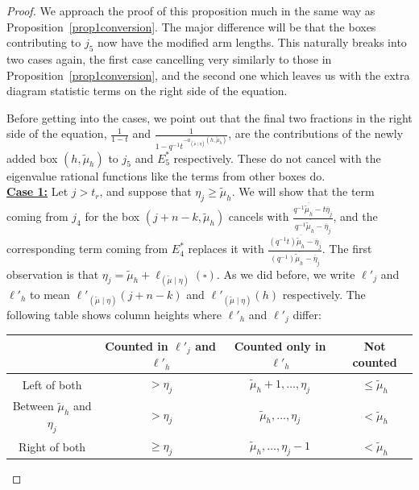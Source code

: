 \documentclass[ALCO]{cedram}
\newcommand{\mutilde}{{\widetilde{\mu}}}
\newcommand{\mutildeeta}{{(\mutilde \mid \eta)}}
\newcommand{\leg}[1]{{\ell_{#1}(\square)}}
\newcommand{\jfour}{j_4}
\newcommand{\jfive}{j_5}
\newcommand{\Estarfour}{E^*_4}
\newcommand{\Estarfive}{E^*_5}
\newcommand{\lj}{\ell'_j}
\newcommand{\lh}{\ell'_h}
\begin{document}
\begin{proof} 
We approach the proof of this proposition much in the same way as Proposition~\ref{prop1conversion}. The major difference will be that the boxes contributing to $\jfive$ now have the modified arm lengths. This naturally breaks into two cases again, the first case cancelling very similarly to those in Proposition~\ref{prop1conversion}, and the second one which leaves us with the extra diagram statistic terms on the right side of the equation.

Before getting into the cases, we point out that the final two fractions in the right side of the equation, $\displaystyle{\frac{1}{1-t}}$ and $\displaystyle{\frac{1}{1-q^{-1}t^{-a_\mutildeeta(h,\mutilde_h)}}}$, are the contributions of the newly added box $(h,\mutilde_h)$ to $\jfive$ and $\Estarfive$ respectively. These do not cancel with the eigenvalue rational functions like the terms from other boxes do.\\

\underline{\textbf{Case 1:}} Let $j>t_r$, and suppose that $\eta_j \geq \mutilde_h$. We will show that the term coming from $\jfour$ for the box $(j+n-k,\mutilde_h)$ cancels with $\displaystyle{\frac{q^{-1} \overline{\mutilde_h} -t\overline{\eta}_j}{q^{-1} \overline{\mutilde_h} -\overline{\eta}_j}}$, and the corresponding term coming from $\Estarfour$ replaces it with $\displaystyle{\frac{(q^{-1}t) \overline{\mutilde_h} -\overline{\eta}_j}{(q^{-1}) \overline{\mutilde_h} -\overline{\eta}_j}}$. The first observation is that $\eta_j = \mutilde_h + \leg{\mutildeeta}$. As we did before, we write $\lj$ and $\lh$ to mean $\ell'_\mutildeeta(j+n-k)$ and $\ell'_\mutildeeta(h)$ respectively. The following table shows column heights where $\lh$ and $\lj$ differ:

\begin{center}\begin{tabular}{|c|c|c|c|}
     \hline
     & Counted in $\lj$ and $\lh$ & Counted only in $\lh$ & Not counted   \\ \hline
     Left of both& $>\eta_j$ & $\mutilde_h+1, \dotsc, \eta_j$& $\leq \mutilde_h$ \\ \hline
     Between $\mutilde_h$ and $\eta_j$ & $>\eta_j$ & $\mutilde_h, \dotsc, \eta_j$& $<\mutilde_h$\\ \hline 
     Right of both & $\geq \eta_j$ & $\mutilde_h, \dotsc, \eta_j-1$ & $<\mutilde_h$\\ \hline 
\end{tabular}
\end{center}


\end{proof}
\end{document}
